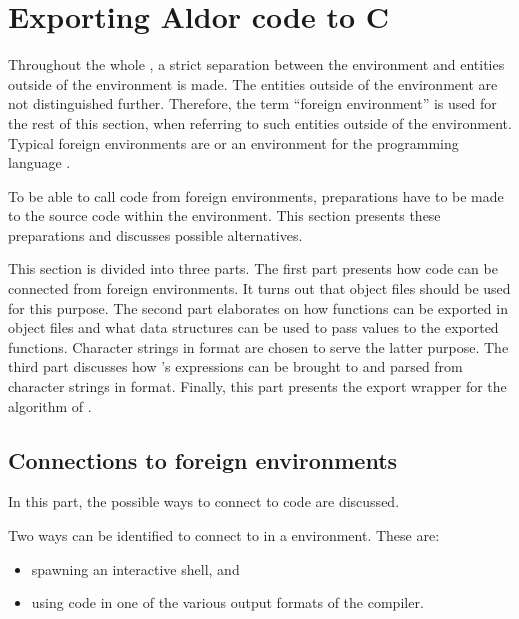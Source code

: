 \clearpage
\section{Exporting Aldor code to C}

Throughout the whole , a strict separation between the \Aldor environment and entities outside of the \Aldor environment is made. The entities outside of the \Aldor environment are not distinguished further. Therefore, the term ``foreign environment'' is used for the rest of this section, when referring to such entities outside of the \Aldor environment. Typical foreign environments are \Maple or an environment for the programming language \C. 

To be able to call \Aldor code from foreign environments, preparations have to be made to the source code within the \Aldor environment. This section presents these preparations and discusses possible alternatives.

This section is divided into three parts.
The first part presents how \Aldor code can be connected from foreign environments. It turns out that object files should be used for this purpose. 
The second part elaborates on how functions can be exported in object files and what data structures can be used to pass values to the exported functions. Character strings in \C format are chosen to serve the latter purpose.
The third part discusses how \Aldor's expressions can be brought to and parsed from character strings in \C format. Finally, this part presents the export wrapper for the  algorithm of .





\subsection{Connections to foreign environments}

In this part, the possible ways to connect to \Aldor code are discussed.

Two ways can be identified to connect to \Aldor in a \GNULinux environment.
These are:
\begin{itemize}
\item spawning an interactive \Aldor shell, and
\item using \Aldor code in one of the various output formats of the \Aldor compiler.
\end{itemize}

